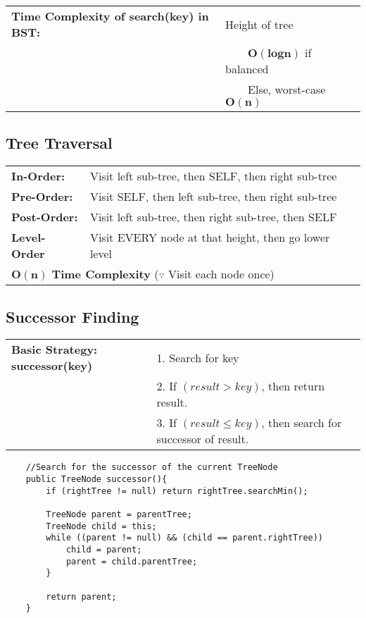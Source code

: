 \documentclass{article}
\newcommand{\tabitem}{~~\llap{\textbullet}~~}
\begin{document}
    \noindent\begin{tabular}{ll}
        \textbf{Time Complexity of search(key) in BST:} & Height of tree\\
        & \tabitem $\bm{O(logn)}$ if balanced\\
        & \tabitem Else, worst-case $\bm{O(n)}$\\
    \end{tabular}

    \subsection{Tree Traversal}

    \begin{tabular}{ll}
        \textbf{In-Order:} & Visit left sub-tree, then SELF, then right sub-tree\\
        \textbf{Pre-Order:} & Visit SELF, then left sub-tree, then right sub-tree\\
        \textbf{Post-Order:} & Visit left sub-tree, then right sub-tree, then SELF\\
        \textbf{Level-Order} & Visit EVERY node at that height, then go lower level\\
        \multicolumn{2}{l}{$\bm{O(n)}$ \textbf{Time Complexity} ($\because$ Visit each node once)}\\
    \end{tabular}

    \subsection{Successor Finding}

    \begin{tabular}{ll}
        \textbf{Basic Strategy: successor(key)} & 1. Search for key\\
        &2. If $(result > key)$, then return result.\\
        &3. If $(result \leq key)$, then search for successor
        of result.\\
    \end{tabular}

    \begin{verbatim}
    //Search for the successor of the current TreeNode
    public TreeNode successor(){
        if (rightTree != null) return rightTree.searchMin();

        TreeNode parent = parentTree;
        TreeNode child = this;
        while ((parent != null) && (child == parent.rightTree))
            child = parent;
            parent = child.parentTree;
        }
        
        return parent;
    }
    \end{verbatim}
\end{document}
